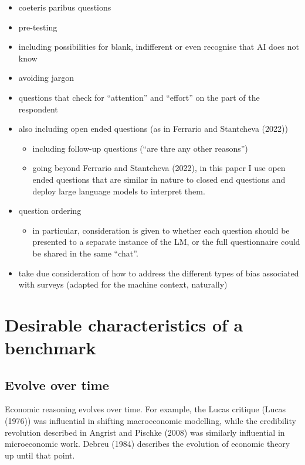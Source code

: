 \documentclass[
]{article}
\providecommand{\tightlist}{%
  \setlength{\itemsep}{0pt}\setlength{\parskip}{0pt}}\usepackage{longtable,booktabs,array}
\begin{document}
\begin{itemize}
\tightlist
\item
  coeteris paribus questions
\item
  pre-testing
\item
  including possibilities for blank, indifferent or even recognise that
  AI does not know
\item
  avoiding jargon
\item
  questions that check for ``attention'' and ``effort'' on the part of
  the respondent
\item
  also including open ended questions (as in Ferrario and Stantcheva
  (2022))

  \begin{itemize}
  \tightlist
  \item
    including follow-up questions (``are thre any other reasons'')
  \item
    going beyond Ferrario and Stantcheva (2022), in this paper I use
    open ended questions that are similar in nature to closed end
    questions and deploy large language models to interpret them.
  \end{itemize}
\item
  question ordering

  \begin{itemize}
  \tightlist
  \item
    in particular, consideration is given to whether each question
    should be presented to a separate instance of the LM, or the full
    questionnaire could be shared in the same ``chat''.
  \end{itemize}
\item
  take due consideration of how to address the different types of bias
  associated with surveys (adapted for the machine context, naturally)
\end{itemize}

\hypertarget{desirable-characteristics-of-a-benchmark}{%
\section{Desirable characteristics of a
benchmark}\label{desirable-characteristics-of-a-benchmark}}

\hypertarget{evolve-over-time}{%
\subsection{Evolve over time}\label{evolve-over-time}}

Economic reasoning evolves over time. For example, the Lucas critique
(Lucas (1976)) was influential in shifting macroeconomic modelling,
while the credibility revolution described in Angrist and Pischke (2008)
was similarly influential in microeconomic work. Debreu (1984) describes
the evolution of economic theory up until that point.
\end{document}

